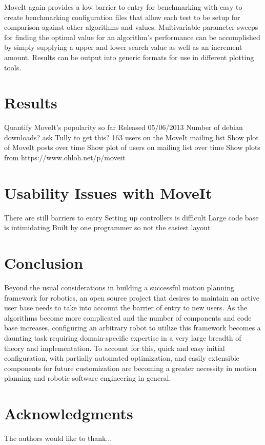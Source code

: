 \documentclass[10pt,journal,compsoc]{joser1}
\begin{document}
{MoveIt again provides a low barrier to entry for benchmarking with easy to create benchmarking configuration files that allow each test to be setup for comparison against other algorithms and values. Multivariable parameter sweeps for finding the optimal value for an algorithm's performance can be accomplished by simply supplying a upper and lower search value as well as an increment amount. Results can be output into generic formats for use in different plotting tools.

\section{Results}

Quantify MoveIt's popularity so far
Released 05/06/2013
Number of debian downloads? ask Tully to get this?
163 users on the MoveIt mailing list
Show plot of MoveIt posts over time
Show plot of users on mailing list over time
Show plots from https://www.ohloh.net/p/moveit

\section{Usability Issues with MoveIt}

There are still barriers to entry
Setting up controllers is difficult
Large code base is intimidating
Built by one programmer so not the easiest layout


\section{Conclusion}
Beyond the usual considerations in building a successful motion planning framework for robotics, an open source project that desires to maintain an active user base needs to take into account the barrier of entry to new users. As the algorithms become more complicated and the number of components and code base increases, configuring an arbitrary robot to utilize this framework becomes a daunting task requiring domain-specific expertise in a very large breadth of theory and implementation. To account for this, quick and easy initial configuration, with partially automated optimization, and easily extensible components for future customization are becoming a greater necessity in motion planning and robotic software engineering in general. 

\section*{Acknowledgments}
The authors would like to thank...

}
\end{document}

